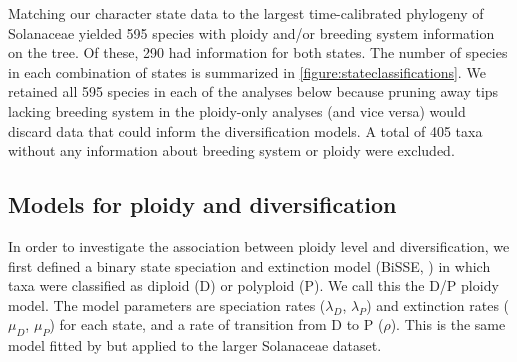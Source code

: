 Matching our character state data to the largest time-calibrated phylogeny of Solanaceae \citep{sarkinen_2013} yielded 595 species with ploidy and/or breeding system information on the tree.
Of these, 290 had information for both states.
The number of species in each combination of states is summarized in \cref{figure:stateclassifications}.
We retained all 595 species in each of the analyses below because pruning away tips lacking breeding system in the ploidy-only analyses (and vice versa) would discard data that could inform the diversification models.
A total of 405 taxa without any information about breeding system or ploidy were excluded.



\subsection{Models for ploidy and diversification}

In order to investigate the association between ploidy level and diversification, we first defined a binary state speciation and extinction model (BiSSE, \citealt{maddison_2007}) in which taxa were classified as diploid (D) or polyploid (P).
We call this the D/P ploidy model.
The model parameters are speciation rates ($\lambda_D$, $\lambda_P$) and extinction rates ($\mu_D$, $\mu_P$) for each state, and a rate of transition from D to P ($\rho$). This is the same model fitted by \citet{mayrose_2011} but applied to the larger Solanaceae dataset.


